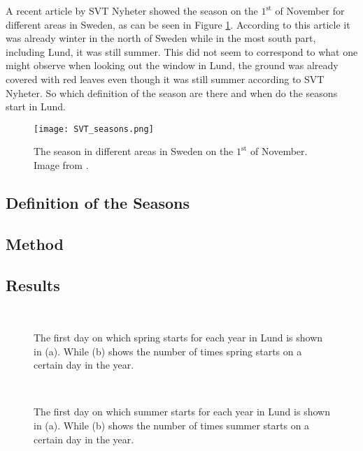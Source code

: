 

A recent article by SVT Nyheter showed the season on the $1^\text{st}$ of November for different areas in Sweden, as can be seen in Figure \ref{fig:SVT}. According to this article it was already winter in the north of Sweden while in the most south part, including Lund, it was still summer. This did not seem to correspond to what one might observe when looking out the window in Lund, the ground was already covered with red leaves even though it was still summer according to SVT Nyheter. So which definition of the season are there and when do the seasons start in Lund. 

\begin{figure}[h!]
\centering
\texttt{[image: SVT\_seasons.png]}
\caption{The season in different areas in Sweden on the $1^\text{st}$ of November. Image from \cite{SVT}.}
\label{fig:SVT}
\end{figure}

\subsection{Definition of the Seasons}
\cite{SMHI}


\subsection{Method}

\subsection{Results}

\begin{figure}[ht!]
\centering
{} 
\\
\caption{The first day on which spring starts for each year in Lund is shown in (a).  While (b) shows the number of times spring starts on a certain day in the year.}
\label{fig:spring}
\end{figure}

\begin{figure}[ht!]
\centering
{} 
\\
\caption{The first day on which summer starts for each year in Lund is shown in (a).  While (b) shows the number of times summer starts on a certain day in the year.}
\label{fig:summer}
\end{figure}

